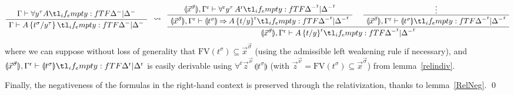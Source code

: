 \documentclass{CSML}
\newcommand*\ifpresent[3]{\tl_if_empty:fTF{#1}{#3}{#2}}
\newcommand*\AXM[1]{\AxiomC{$#1$}}
\newcommand*\UIM[1]{\UnaryInfC{$#1$}}
\newcommand*\BIM[1]{\BinaryInfC{$#1$}}
\newcommand*\DP\DisplayProof
\newcommand*\Entails{\mathrel{\vdash}}
\newcommand*\BarSep{\mathrel{|}}
\newcommand*\Sequent[3]{#1\Entails#2\ifpresent{#3}{\BarSep}{}#3}
\newcommand*\FV[1]{\text{FV}\left(#1\right)}
\newcommand*\SortA{\sigma}
\newcommand*\SortB{\tau}
\newcommand*\SortC{\nu}
\newcommand*\LogSortedTerm[2]{#1^{#2}}
\newcommand*\LogTermA{t}
\newcommand*\LogVarA{x}
\newcommand*\LogVarB{y}
\newcommand*\LogVarC{z}
\newcommand*\LogNeg[1]{{#1^-}}
\newcommand*\LogImp{\mathbin{\Rightarrow}}
\newcommand*\LogRel[1]{\llparenthesis#1\rrparenthesis}
\newcommand*\LogRelForm[1]{{#1^\mathrm{r}}}
\newcommand*\LogForallRel{\forall^\mathrm{r}}
\newcommand*\LogFormA{A}
\newcommand*\LogSubst[1]{\left\{#1\right\}}
\newcommand*\LogRuleForallElimFirst[5]{\Sequent{#1}{\forall#3#5}{#2}}
\newcommand*\LogRuleForallElimConcl[5]{\Sequent{#1}{#5\LogSubst{#4/#3}}{#2}}
\newcommand*\LogRuleForallElim[5]{\AXM{\LogRuleForallElimFirst{#1}{#2}{#3}{#4}{#5}}\UIM{\LogRuleForallElimConcl{#1}{#2}{#3}{#4}{#5}}\DP}
\begin{document}
$$
\LogRuleForallElim{\Gamma}{\LogNeg{\Delta}}{\LogSortedTerm{\LogVarB}{\SortB}}{\LogSortedTerm{\LogTermA}{\SortA}}{\LogFormA}\;\;\rightsquigarrow\;\;
\AXM{\Sequent{\LogRel{\LogSortedTerm{\vec{\LogVarA}}{\vec{\SortA}}},\LogRelForm{\Gamma}}{\LogForallRel\LogSortedTerm{\LogVarB}{\SortB}\,\LogRelForm{\LogFormA}}{\LogRelForm{\LogNeg{\Delta}}}}
\UIM{\Sequent{\LogRel{\LogSortedTerm{\vec{\LogVarA}}{\vec{\SortA}}},\LogRelForm{\Gamma}}{\LogRel{\LogSortedTerm{\LogTermA}{\SortA}}\LogImp\LogRelForm{\LogFormA\LogSubst{\LogTermA/\LogVarB}}}{\LogRelForm{\LogNeg{\Delta}}}}
\AXM{\vdots}
\UIM{\Sequent{\LogRel{\LogSortedTerm{\vec{\LogVarA}}{\vec{\SortA}}},\LogRelForm{\Gamma}}{\LogRel{\LogSortedTerm{\LogTermA}{\SortA}}}{\LogRelForm{\LogNeg{\Delta}}}}
\BIM{\Sequent{\LogRel{\LogSortedTerm{\vec{\LogVarA}}{\vec{\SortA}}},\LogRelForm{\Gamma}}{\LogRelForm{\LogFormA\LogSubst{\LogTermA/\LogVarB}}}{\LogRelForm{\LogNeg{\Delta}}}}
\DP
$$
where we can suppose without loss of generality that $\FV{\LogSortedTerm{\LogTermA}{\SortA}}\subseteq\LogSortedTerm{\vec{\LogVarA}}{\vec{\SortA}}$ (using the admissible left weakening rule if necessary), and $\Sequent{\LogRel{\LogSortedTerm{\vec{\LogVarA}}{\vec{\SortA}}},\LogRelForm{\Gamma}}{\LogRel{\LogSortedTerm{\LogTermA}{\SortA}}}{\LogRelForm{\Delta}}$ is easily derivable using $\LogForallRel\LogSortedTerm{\vec{\LogVarC}}{\vec{\SortC}}\,\LogRel{\LogSortedTerm{\LogTermA}{\SortA}}$ (with $\LogSortedTerm{\vec{\LogVarC}}{\vec{\SortC}}=\FV{\LogSortedTerm{\LogTermA}{\SortA}}\subseteq\LogSortedTerm{\vec{\LogVarA}}{\vec{\SortA}}$) from lemma~\ref{relindiv}.\par
Finally, the negativeness of the formulas in the right-hand context is preserved through the relativization, thanks to lemma~\ref{RelNeg}.
\qed
\end{document}
